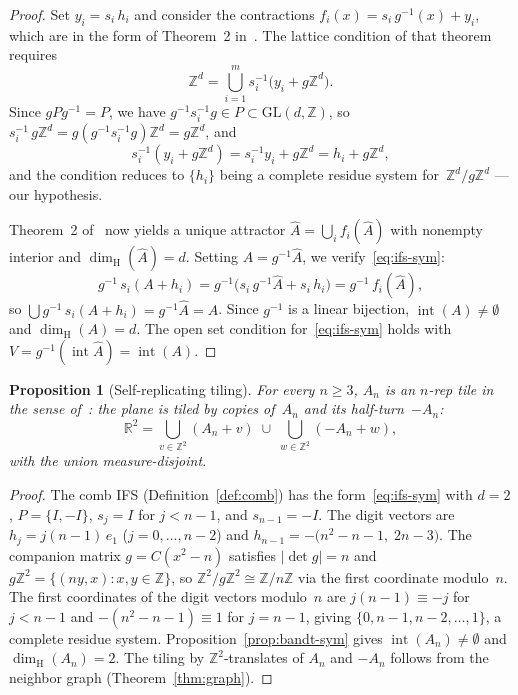 \documentclass{amsart}
\newtheorem{proposition}[theorem]{Proposition}
\theoremstyle{definition}
\theoremstyle{remark}
\newcommand{\R}{\mathbb{R}}
\newcommand{\Z}{\mathbb{Z}}
\newcommand{\dH}{\dim_{\mathrm{H}}}
\begin{document}
\begin{proof}
Set $y_i = s_i\,h_i$ and consider the contractions
$f_i(x) = s_i\,g^{-1}(x) + y_i$, which are in the
form of Theorem~2 in~\cite{bandt1991}.
The lattice condition of that theorem requires
\[
  \Z^d = \bigcup_{i=1}^{m} s_i^{-1}\bigl(y_i + g\Z^d\bigr).
\]
Since $gPg^{-1} = P$, we have
$g^{-1}s_i^{-1}g \in P \subset \mathrm{GL}(d,\Z)$, so
$s_i^{-1}\,g\Z^d = g(g^{-1}s_i^{-1}g)\Z^d = g\Z^d$, and
\[
  s_i^{-1}(y_i + g\Z^d)
  = s_i^{-1}y_i + g\Z^d
  = h_i + g\Z^d,
\]
and the condition reduces to $\{h_i\}$ being a complete
residue system for~$\Z^d/g\Z^d$ --- our hypothesis.

Theorem~2 of~\cite{bandt1991} now yields a unique attractor
$\hat{A} = \bigcup_i f_i(\hat{A})$ with nonempty interior and
$\dH(\hat{A}) = d$.
Setting $A = g^{-1}\hat{A}$, we verify~\eqref{eq:ifs-sym}:
\[
  g^{-1}\,s_i(A + h_i)
  = g^{-1}\bigl(s_i\,g^{-1}\hat{A} + s_i\,h_i\bigr)
  = g^{-1}\,f_i(\hat{A}),
\]
so $\bigcup g^{-1}\,s_i(A + h_i)
  = g^{-1}\hat{A} = A$.
Since $g^{-1}$ is a linear bijection,
$\operatorname{int}(A) \ne \emptyset$ and $\dH(A) = d$.
The open set condition
for~\eqref{eq:ifs-sym} holds with
$V = g^{-1}(\operatorname{int}\hat{A}) = \operatorname{int}(A)$.
\end{proof}

\begin{proposition}[Self-replicating tiling]\label{prop:tiling}
For every $n \ge 3$, $A_n$ is an $n$-rep tile in the sense
of~\cite{bandt1991}: the plane is tiled by copies of~$A_n$ and its
half-turn~$-A_n$:
\[
  \R^2 = \bigcup_{v \in \Z^2} (A_n + v)
         \;\cup\; \bigcup_{w \in \Z^2} (-A_n + w),
\]
with the union measure-disjoint.
\end{proposition}

\begin{proof}
The comb IFS (Definition~\ref{def:comb}) has the
form~\eqref{eq:ifs-sym} with $d = 2$, $P = \{I, -I\}$,
$s_j = I$ for $j < n{-}1$, and $s_{n-1} = -I$.
The digit vectors are
$h_j = j(n{-}1)\,e_1$ ($j = 0,\ldots,n{-}2$)
and $h_{n-1} = -\bigl(n^2{-}n{-}1,\;2n{-}3\bigr)$.
The companion matrix $g = C(x^2 - n)$ satisfies $|\det g| = n$
and $g\Z^2 = \{(ny, x) : x,y \in \Z\}$, so
$\Z^2/g\Z^2 \cong \Z/n\Z$ via the first coordinate modulo~$n$.
The first coordinates of the digit vectors modulo~$n$ are
$j(n{-}1) \equiv -j$ for $j < n{-}1$ and
$-(n^2{-}n{-}1) \equiv 1$ for $j = n{-}1$,
giving $\{0, n{-}1, n{-}2, \ldots, 1\}$, a complete
residue system.
Proposition~\ref{prop:bandt-sym} gives
$\operatorname{int}(A_n) \ne \emptyset$ and $\dH(A_n) = 2$.
The tiling by $\Z^2$-translates of $A_n$ and $-A_n$
follows from the neighbor graph (Theorem~\ref{thm:graph}).
\end{proof}
\end{document}

